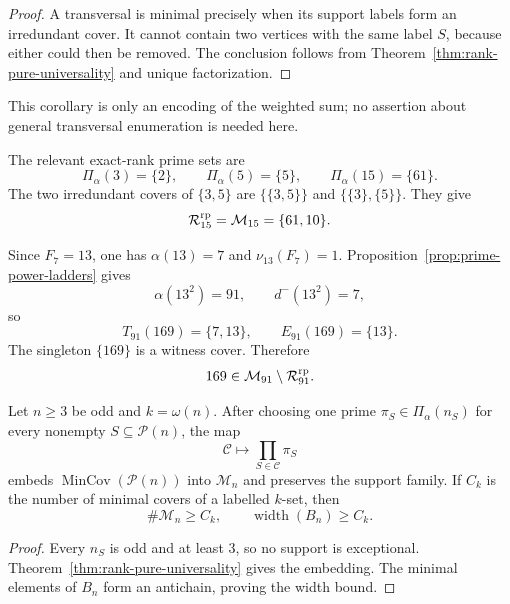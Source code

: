 \begin{proof}
A transversal is minimal precisely when its support labels form an
irredundant cover.  It cannot contain two vertices with the same label $S$,
because either could then be removed.  The conclusion follows from
Theorem~\ref{thm:rank-pure-universality} and unique factorization.
\end{proof}

This corollary is only an encoding of the weighted sum; no assertion about
general transversal enumeration is needed here.

\begin{example}[The squarefree layer $n=15$]
The relevant exact-rank prime sets are
\[
 \Pi_\alpha(3)=\{2\},\qquad
 \Pi_\alpha(5)=\{5\},\qquad
 \Pi_\alpha(15)=\{61\}.
\]
The two irredundant covers of $\{3,5\}$ are
$\{\{3,5\}\}$ and $\{\{3\},\{5\}\}$.  They give
\[
 \mathcal R_{15}^{\rm rp}=\mathcal M_{15}=\{61,10\}.
\]
\end{example}

\begin{example}[The ladder boundary at $n=91$]
Since $F_7=13$, one has $\alpha(13)=7$ and
$\nu_{13}(F_7)=1$.  Proposition~\ref{prop:prime-power-ladders} gives
\[
 \alpha(13^2)=91,\qquad d^-(13^2)=7,
\]
so
\[
 T_{91}(169)=\{7,13\},\qquad E_{91}(169)=\{13\}.
\]
The singleton $\{169\}$ is a witness cover.  Therefore
\[
 169\in\mathcal M_{91}\setminus\mathcal R_{91}^{\rm rp}.
\]
\end{example}

\begin{corollary}
\label{cor:odd-rank-pure-universality}
Let $n\geq3$ be odd and $k=\omega(n)$.  After choosing one prime
$\pi_S\in\Pi_\alpha(n_S)$ for every nonempty
$S\subseteq\mathcal P(n)$, the map
\[
 \mathcal C\longmapsto\prod_{S\in\mathcal C}\pi_S
\]
embeds $\operatorname{MinCov}(\mathcal P(n))$ into $\mathcal M_n$ and
preserves the support family.  If $C_k$ is the number of minimal covers of a
labelled $k$-set, then
\begin{equation}\label{eq:odd-minimal-cover-bound}
 \#\mathcal M_n\geq C_k,
 \qquad \operatorname{width}(B_n)\geq C_k.
\end{equation}
\end{corollary}

\begin{proof}
Every $n_S$ is odd and at least $3$, so no support is exceptional.
Theorem~\ref{thm:rank-pure-universality} gives the embedding.  The minimal
elements of $B_n$ form an antichain, proving the width bound.
\end{proof}


